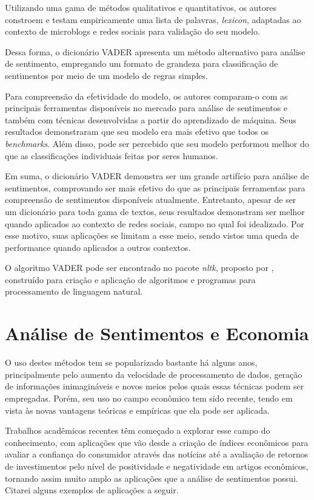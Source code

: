 Utilizando uma gama de métodos qualitativos e quantitativos, os autores constroem e testam empiricamente uma lista de palavras, \textit{lexicon}, adaptadas ao contexto de microblogs e redes sociais para validação do seu modelo. 

Dessa forma, o dicionário VADER apresenta um método alternativo para análise de sentimento, empregando um formato de grandeza para classificação de sentimentos por meio de um modelo de regras simples.

Para compreensão da efetividade do modelo, os autores  comparam-o com as principais ferramentas disponíveis no mercado para análise de sentimentos e também com técnicas desenvolvidas a partir do aprendizado de máquina. Seus resultados demonstraram que seu modelo era mais efetivo que todos os \textit{benchmarks}. Além disso, pode ser percebido que seu modelo performou melhor do que as classificações individuais feitas por seres humanos.

Em suma, o dicionário VADER demonstra ser um grande artifício para análise de sentimentos, comprovando ser mais efetivo do que as principais ferramentas para compreensão de sentimentos disponíveis atualmente. Entretanto, apesar de ser um dicionário para toda gama de textos, seus resultados demonstram ser melhor quando aplicados ao contexto de redes sociais, campo no qual foi idealizado. Por esse motivo, suas aplicações se limitam a esse meio, sendo vistos uma queda de performance quando aplicados a outros contextos. 

O algoritmo VADER pode ser encontrado no pacote \textit{nltk}, proposto por , construído para criação e aplicação de algoritmos e programas para processamento de linguagem natural.


\section{Análise de Sentimentos e Economia}

O uso destes métodos tem se popularizado bastante há alguns anos, principalmente pelo aumento da velocidade de processamento de dados, geração de informações inimagináveis e novos meios pelos quais essas técnicas podem ser empregadas. Porém, seu uso no campo econômico tem sido recente, tendo em vista às novas vantagens teóricas e empíricas que ela pode ser aplicada. 

Trabalhos acadêmicos recentes têm começado a explorar esse campo do conhecimento, com aplicações que vão desde a criação de índices econômicos para avaliar a confiança do consumidor através das notícias até a avaliação de retornos de investimentos pelo nível de positividade e negatividade em artigos econômicos, tornando assim muito amplo as aplicações que a análise de sentimentos possui. Citarei alguns exemplos de aplicações a seguir.

